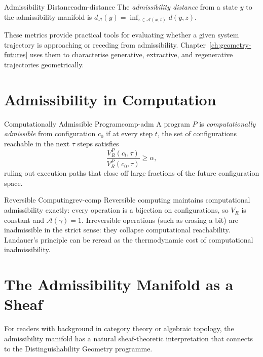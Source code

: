 \documentclass[12pt,twoside,openright]{book}
\newcommand{\csicon} {\marginpar{\tiny\color{DistBlue}\faCode}}
\newcommand{\adm}{\mathcal{A}}
\begin{document}
\begin{definition}{Admissibility Distance}{adm-distance}
  The \emph{admissibility distance} from a state $y$ to the
  admissibility manifold is
  $d_\adm(y) = \inf_{z\in\adm(x,t)} d(y,z)$.
\end{definition}

These metrics provide practical tools for evaluating
whether a given system trajectory is approaching or
receding from admissibility. Chapter~\ref{ch:geometry-futures}
uses them to characterise generative, extractive, and
regenerative trajectories geometrically.

\section{Admissibility in Computation}
\label{sec:ch14-computation}

\csicon

\begin{definition}{Computationally Admissible Program}{comp-adm}
  A program $P$ is \emph{computationally admissible} from
  configuration $c_0$ if at every step $t$, the set of
  configurations reachable in the next $\tau$ steps
  satisfies
  \[
    \frac{V_R^P(c_t,\tau)}{V_R^P(c_0,\tau)} \ge \alpha,
  \]
  ruling out execution paths that close off large fractions
  of the future configuration space.
\end{definition}

\begin{example}{Reversible Computing}{rev-comp}
  Reversible computing maintains computational admissibility
  exactly: every operation is a bijection on configurations,
  so $V_R$ is constant and $\mathcal{A}(\gamma)=1$.
  Irreversible operations (such as erasing a bit) are
  inadmissible in the strict sense: they collapse
  computational reachability. Landauer's principle
  \parencite{landauer1961irreversibility} can be reread as
  the thermodynamic cost of computational inadmissibility.
\end{example}

\section{The Admissibility Manifold as a Sheaf}
\label{sec:ch14-sheaf}

For readers with background in category theory or algebraic
topology, the admissibility manifold has a natural
sheaf-theoretic interpretation that connects to the
Distinguishability Geometry programme.
\end{document}
